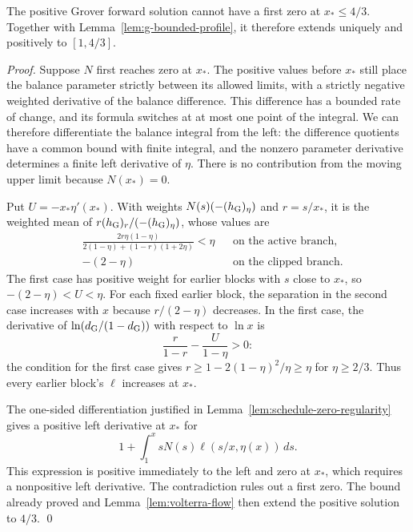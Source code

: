 \documentclass[runningheads,envcountsame,envcountsect,orivec]{llncs}
\begin{document}
\begin{lemma}
\label{lem:g-positive-profile}
The positive Grover forward solution cannot have a first zero
at $x_*\le4/3$. Together with
Lemma~\ref{lem:g-bounded-profile}, it therefore extends
uniquely and positively to $[1,4/3]$.
\end{lemma}

\begin{proof}
Suppose $N$ first reaches zero at $x_*$. The positive values
before $x_*$ still place the balance parameter strictly between
its allowed limits, with a strictly negative weighted derivative
of the balance difference. This difference has a bounded rate of
change, and its formula switches at at most one point of the
integral. We can therefore differentiate the balance integral
from the left: the difference quotients have a common bound with finite integral, and the nonzero parameter derivative determines a finite
left derivative of $\eta$. There is no contribution from the
moving upper limit because $N(x_*)=0$.

Put $U=-x_*\eta'(x_*)$. With weights
$N(s)(-(h_{\rm G})_\eta)$ and $r=s/x_*$, it is the weighted
mean of $r(h_{\rm G})_r/(-(h_{\rm G})_\eta)$, whose values are
\[
 \begin{aligned}
 &\frac{2r\eta(1-\eta)}
       {2(1-\eta)+(1-r)(1+2\eta)}<\eta
 &&\text{on the active branch},\\
 &-(2-\eta)
 &&\text{on the clipped branch}.
 \end{aligned}
\]
The first case has positive weight for earlier blocks with
$s$ close to $x_*$,
so $-(2-\eta)<U<\eta$.
For each fixed earlier block, the separation in the second case
increases with $x$ because $r/(2-\eta)$ decreases. In the first case,
the derivative of $\ln(d_{\rm G}/(1-d_{\rm G}))$ with respect
to $\ln x$ is
\[
 \frac r{1-r}-\frac U{1-\eta}>0:
\]
the condition for the first case gives
$r\ge1-2(1-\eta)^2/\eta\ge\eta$ for $\eta\ge2/3$.
Thus every earlier block's $\ell$ increases at $x_*$.

The one-sided differentiation justified in
Lemma~\ref{lem:schedule-zero-regularity} gives a positive left derivative
at $x_*$ for
\[
 1+\int_1^x sN(s)\ell(s/x,\eta(x))\,ds.
\]
This expression is
positive immediately to the left and zero at $x_*$, which
requires a nonpositive left derivative. The contradiction
rules out a first zero. The bound already proved and Lemma~\ref{lem:volterra-flow}
then extend the positive solution to $4/3$.
\qed
\end{proof}
\end{document}
